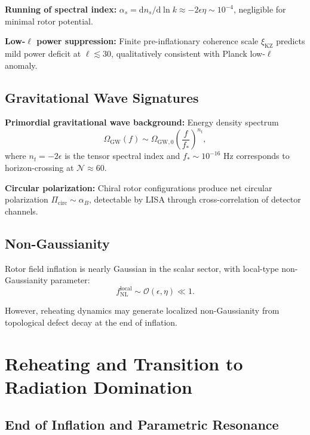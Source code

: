 \documentclass[11pt,a4paper]{article}
\numberwithin{equation}{section}
\theoremstyle{plain}
\theoremstyle{definition}
\theoremstyle{remark}
\newcommand{\dd}{\mathrm{d}}
\begin{document}
\textbf{Running of spectral index:} $\alpha_s = \dd n_s/\dd \ln k \approx -2\epsilon\eta \sim 10^{-4}$, negligible for minimal rotor potential.

\textbf{Low-$\ell$ power suppression:} Finite pre-inflationary coherence scale $\xi_{\mathrm{KZ}}$ predicts mild power deficit at $\ell \lesssim 30$, qualitatively consistent with Planck low-$\ell$ anomaly.

\subsection{Gravitational Wave Signatures}

\textbf{Primordial gravitational wave background:} Energy density spectrum
\begin{equation}
\Omega_{\mathrm{GW}}(f) \sim \Omega_{\mathrm{GW},0}\left(\frac{f}{f_*}\right)^{n_t},
\end{equation}
where $n_t = -2\epsilon$ is the tensor spectral index and $f_* \sim 10^{-16}$ Hz corresponds to horizon-crossing at $\mathcal{N} \approx 60$.

\textbf{Circular polarization:} Chiral rotor configurations produce net circular polarization $\Pi_{\mathrm{circ}} \sim \alpha_B$, detectable by LISA through cross-correlation of detector channels.

\subsection{Non-Gaussianity}

Rotor field inflation is nearly Gaussian in the scalar sector, with local-type non-Gaussianity parameter:
\begin{equation}
f_{\mathrm{NL}}^{\mathrm{local}} \sim \mathcal{O}(\epsilon, \eta) \ll 1.
\end{equation}

However, reheating dynamics may generate localized non-Gaussianity from topological defect decay at the end of inflation.

\section{Reheating and Transition to Radiation Domination}
\label{sec:reheat}

\subsection{End of Inflation and Parametric Resonance}
\end{document}
